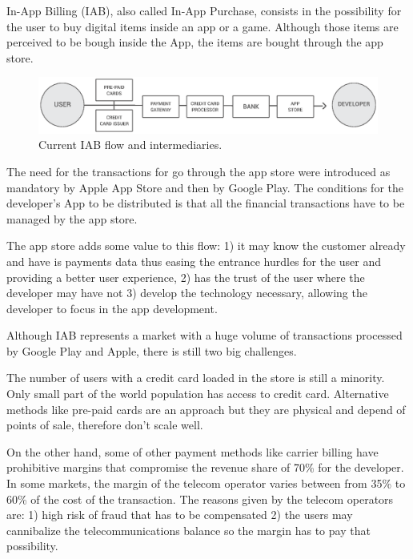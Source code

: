 
In-App Billing (IAB), also called In-App Purchase, consists in the possibility for the user to buy digital items inside an app or a game. Although those items are perceived to be bough inside the App, the items are bought through the app store.

\begin{figure}[!ht]
\centering
\includegraphics[width=\textwidth]{diagrams/iab_flow.eps}
\caption{Current IAB flow and intermediaries.}
\label{fig:iab_flow}
\end{figure}


The need for the transactions for go through the app store were introduced as mandatory by Apple App Store and then by Google Play. The conditions for the developer's App to be distributed is that all the financial transactions have to be managed by the app store. 

The app store adds some value to this flow: 1) it may know the customer already and have is payments data thus easing the entrance hurdles for the user and providing a better user experience, 2) has the trust of the user where the developer may have not 3) develop the technology necessary, allowing the developer to focus in the app development.

Although IAB represents a market with a huge volume of transactions processed by Google Play and Apple, there is still two big challenges.


The number of users with a credit card loaded in the store is still a minority. Only small part of the world population has access to credit card. Alternative methods like pre-paid cards are an approach but they are physical and depend of points of sale, therefore don't scale well.

On the other hand, some of other payment methods like carrier billing have prohibitive margins that compromise the revenue share of 70\% for the developer. In some markets, the margin of the telecom operator varies between from 35\% to 60\% of the cost of the transaction. The reasons given by the telecom operators are: 1) high risk of fraud that has to be compensated 2) the users may cannibalize the telecommunications balance so the margin has to pay that possibility.

